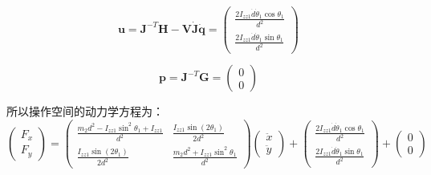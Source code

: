 \documentclass{homework}
\begin{document}
\begin{sol}
\[
  \mathbf{u} = \mathbf{J}^{-T} \mathbf{H} - \mathbf{V} \dot{\mathbf{J}} \dot{\mathbf{q}} =
  \begin{pmatrix}
    \frac{2 I_{zz1} \dot{d} \dot{\theta}_1 \cos\theta_1}{d^2} \\
    \frac{2 I_{zz1} \dot{d} \dot{\theta}_1 \sin\theta_1}{d^2}
  \end{pmatrix}
\]

\[
  \mathbf{p} = \mathbf{J}^{-T} \mathbf{G} =
  \begin{pmatrix}
    0 \\
    0
  \end{pmatrix}
\]

所以操作空间的动力学方程为：
\[
  \begin{pmatrix}
    F_x \\
    F_y
  \end{pmatrix} =
  \begin{pmatrix}
    \frac{m_2 d^2 - I_{zz1} \sin^2\theta_1 + I_{zz1}}{d^2} & \frac{I_{zz1} \sin(2\theta_1)}{2d^2} \\
    \frac{I_{zz1} \sin(2\theta_1)}{2d^2} & \frac{m_2 d^2 + I_{zz1} \sin^2\theta_1}{d^2}
  \end{pmatrix}
  \begin{pmatrix}
    \ddot{x} \\
    \ddot{y}
  \end{pmatrix} +
  \begin{pmatrix}
    \frac{2 I_{zz1} \dot{d} \dot{\theta}_1 \cos\theta_1}{d^2} \\
    \frac{2 I_{zz1} \dot{d} \dot{\theta}_1 \sin\theta_1}{d^2}
  \end{pmatrix} +
  \begin{pmatrix}
    0 \\
    0
  \end{pmatrix}
\]

\end{sol}

\question
\end{document}
